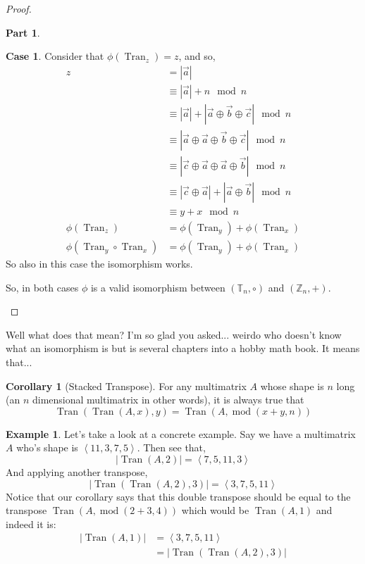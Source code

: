 \documentclass[12pt]{book}
\theoremstyle{plain}
\theoremstyle{definition}
\newtheorem{corollary}{Corollary}[theorem]
\newtheorem{example}{Example}[chapter]
\theoremstyle{ppart}
\newtheorem{ppart}{Part}
\theoremstyle{case}
\newtheorem{case}{Case}
\theoremstyle{solution}
\DeclareMathOperator{\Tran}{Tran}
\DeclareMathOperator{\remainder}{mod}
\newcommand{\shape}[1]{\left|#1\right|}
\begin{document}
\begin{proof}
\begin{ppart}
\begin{case}
Consider that $\phi(\Tran_z) = z$, and so,
\begin{align*}
  z
  &= \shape{\vec{a}} \\
  &\equiv \shape{\vec{a}} + n \mod n \\
  &\equiv \shape{\vec{a}} + \shape{\vec{a} \oplus \vec{b} \oplus \vec{c}} \mod n \\
  &\equiv \shape{\vec{a} \oplus \vec{a} \oplus \vec{b} \oplus \vec{c}} \mod n \\
  &\equiv \shape{\vec{c} \oplus \vec{a} \oplus \vec{a} \oplus \vec{b}} \mod n \\
  &\equiv \shape{\vec{c} \oplus \vec{a}} + \shape{\vec{a} \oplus \vec{b}} \mod n \\
  &\equiv y + x \mod n \\
  \phi(\Tran_z) &= \phi(\Tran_y) + \phi(\Tran_x) \\
  \phi(\Tran_y \circ \Tran_x) &= \phi(\Tran_y) + \phi(\Tran_x)
\end{align*}
So also in this case the isomorphism works.
\end{case}

So, in both cases $\phi$ is a valid isomorphism between $(\mathbb{T}_n, \circ)$
and $(\mathbb{Z}_n, +)$.
\end{ppart}
\end{proof}

Well what does that mean? I'm so glad you asked... weirdo who doesn't know what
an isomorphism is but is several chapters into a hobby math book. It means that...

\begin{corollary}[Stacked Transpose]
For any multimatrix $A$ whose shape is $n$ long (an $n$ dimensional multimatrix
in other words), it is always true that
\[ \Tran(\Tran(A, x),y) = \Tran(A, \remainder(x+y,n)) \]
\end{corollary}

\begin{example}
Let's take a look at a concrete example. Say we have a
multimatrix $A$ who's shape is $\left<11, 3, 7, 5\right>$. 
Then see that,
\[ \shape{\Tran(A, 2)} = \left<7, 5, 11, 3\right> \]
And applying another transpose,
\[ \shape{\Tran(\Tran(A, 2), 3)} = \left<3, 7, 5, 11\right> \]
Notice that our corollary says that this double transpose should be
equal to the transpose $\Tran(A, \remainder(2+3, 4))$ which would
be $\Tran(A, 1)$ and indeed it is:
\begin{align*}
  \shape{\Tran(A, 1)}
  &= \left<3, 7, 5, 11\right> \\
  &= \shape{\Tran(\Tran(A, 2), 3)}
\end{align*}
\end{example}
\end{document}
